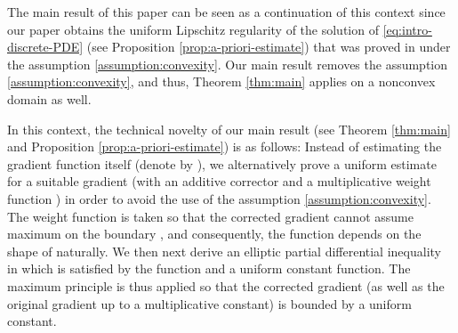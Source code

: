 \documentclass[11pt]{article}
\makeatletter
\numberwithin{equation}{section}
\newtheorem{corollary}[theorem]{Corollary}
\newcounter{mathrecordid}
\newcommand{\mathboxbegin}[1]{%
  \stepcounter{mathrecordid}%
  \immediate\write\mathrecords{\themathrecordid,#1}%
  \special{pdf:bann << /Type /Annot /Subtype /Link /Border [0 0 0]
    /MathBoxID \themathrecordid /F 2
    /A << /S /URI /URI (urn:mathbox:\themathrecordid) >> >>}}
\newcommand{\mathboxinlineplain}[1]{$#1$}
\newcommand{\mathboxinline}[1]{%
  $\mathboxbegin{inline}%
  \special{pdf:literal direct /MathBoxBegin\themathrecordid\space MP}%
  #1\special{pdf:literal direct /MathBoxEnd\themathrecordid\space MP}%
  \special{pdf:eann}$}
\newcommand{\recordmath}{%
  \ifmeasuring@\expandafter\mathboxinlineplain
  \else\expandafter\mathboxinline\fi}
\makeatother
\begin{document}
The main result of this paper can be seen as a continuation of this context since our paper obtains the uniform Lipschitz regularity of the solution \recordmath{w} of \eqref{eq:intro-discrete-PDE} (see Proposition \ref{prop:a-priori-estimate}) that was proved in \cite{EG25} under the assumption \eqref{assumption:convexity}. Our main result removes the assumption \eqref{assumption:convexity}, and thus, Theorem \ref{thm:main} applies on a nonconvex domain as well.



In this context, the technical novelty of our main result (see Theorem \ref{thm:main} and Proposition \ref{prop:a-priori-estimate}) is as follows: Instead of estimating the gradient function itself (denote by \recordmath{\phi}), we alternatively prove a uniform estimate for a suitable gradient \recordmath{z:=\rho(\phi + \psi)} (with an additive corrector \recordmath{\psi} and a multiplicative weight function \recordmath{\rho}) in order to avoid the use of the assumption \eqref{assumption:convexity}. The weight function \recordmath{\rho} is taken so that the corrected gradient \recordmath{z} cannot assume maximum on the boundary \recordmath{\partial\Omega}, and consequently, the function \recordmath{\rho} depends on the shape of \recordmath{\partial\Omega} naturally. We then next derive an elliptic partial differential inequality in \recordmath{\Omega} which is satisfied by the function \recordmath{z} and a uniform constant function. The maximum principle is thus applied so that the corrected gradient \recordmath{z} (as well as the original gradient \recordmath{\phi} up to a multiplicative constant) is bounded by a uniform constant.





\end{document}
